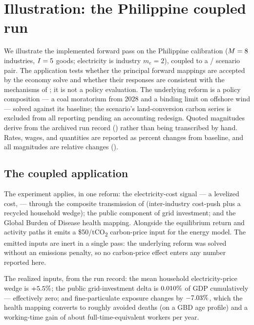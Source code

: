 \section{Illustration: the Philippine coupled run}
\label{sec:results}

We illustrate the implemented forward pass on the Philippine calibration ($M=8$
industries, $I=5$ goods; electricity is industry $m_e=2$), coupled to a
\CLEWS{}/\OSeMOSYS{} scenario pair. The application tests whether the principal forward
mappings are accepted by the economy solve and whether their responses are consistent
with the mechanisms of ; it is not a policy evaluation. The
underlying reform is a policy composition --- a coal moratorium from 2028 and a
binding limit on offshore wind --- solved against its baseline; the scenario's
land-conversion carbon series is excluded from all reporting pending an accounting
redesign. Quoted magnitudes derive from the archived run record
() rather than being transcribed by hand. Rates, wages, and
quantities are reported as percent changes from baseline, and all magnitudes are
relative changes ().

\subsection{The coupled application}
\label{sec:coupled}
The  experiment applies, in one reform: the \CLEWS{} electricity-cost
signal --- a levelized cost,  --- through the composite transmission
of  (inter-industry cost-push plus a recycled household wedge); the
public component of grid investment; and the Global Burden of Disease health mapping.
Alongside the equilibrium return and activity paths it emits a \$50/tCO\textsubscript{2}
carbon-price input for the energy model. The emitted inputs are inert in a single pass:
the underlying \CLEWS{} reform was solved without an emissions penalty, so no
carbon-price effect enters any number reported here.

The realized inputs, from the run record: the mean household electricity-price wedge is
$+5.5\%$; the public grid-investment delta is $0.010\%$ of GDP
cumulatively --- effectively zero; and fine-particulate exposure changes by
$-7.03\%$, which the health mapping converts to roughly \cplDeaths{} avoided deaths
(on a GBD age profile) and a working-time gain of about \cplMorbFTE{}
full-time-equivalent workers per year.

